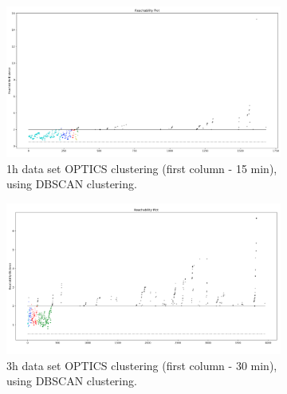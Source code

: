 \begin{figure}[H]
  \centering
  \begin{subfigure}{.5\textwidth}
    \centering
    \includegraphics[width=1\textwidth]{./images/clusteringResults/1h-1-reachabilityPlot.png}
  \caption{1h data set OPTICS clustering (first column - 15 min), using DBSCAN clustering.}
  \end{subfigure}%
  \begin{subfigure}{.5\textwidth}
    \centering
    \includegraphics[width=1\textwidth]{./images/clusteringResults/3h-1-reachabilityPlot.png}
    \caption{3h data set OPTICS clustering (first column - 30 min), using DBSCAN clustering.}
  \end{subfigure}
  \caption{}
  \label{figure:OPTICSResultsReachabilityPlot}
  \end{figure}












